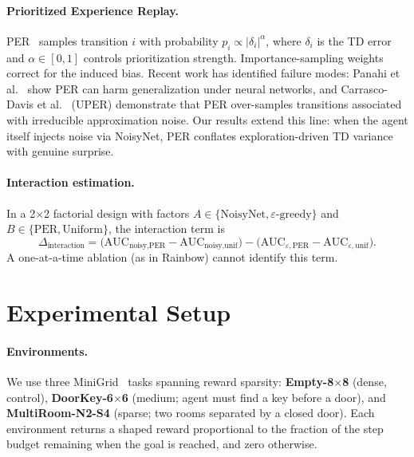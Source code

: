 \documentclass{article}
\begin{document}
\paragraph{Prioritized Experience Replay.}
PER~\cite{schaul2016prioritized} samples transition $i$ with probability
$p_i \propto |\delta_i|^\alpha$, where $\delta_i$ is the TD error and
$\alpha \in [0,1]$ controls prioritization strength.
Importance-sampling weights correct for the induced bias.
Recent work has identified failure modes: Panahi et al.~\cite{panahi2024per}
show PER can harm generalization under neural networks, and
Carrasco-Davis et al.~\cite{carrasco2025uper} (UPER) demonstrate that PER
over-samples transitions associated with irreducible approximation noise.
Our results extend this line: when the agent itself injects noise via
NoisyNet, PER conflates exploration-driven TD variance with genuine surprise.

\paragraph{Interaction estimation.}
In a 2$\times$2 factorial design with factors
$A \in \{\text{NoisyNet}, \varepsilon\text{-greedy}\}$ and
$B \in \{\text{PER}, \text{Uniform}\}$, the interaction term is
\begin{equation}
  \Delta_\text{interaction}
  = \bigl(\text{AUC}_{\text{noisy,PER}} - \text{AUC}_{\text{noisy,unif}}\bigr)
  - \bigl(\text{AUC}_{\varepsilon,\text{PER}} - \text{AUC}_{\varepsilon,\text{unif}}\bigr).
  \label{eq:interaction}
\end{equation}
A one-at-a-time ablation (as in Rainbow) cannot identify this term.

\section{Experimental Setup}
\label{sec:setup}

\paragraph{Environments.}
We use three MiniGrid~\cite{minigrid} tasks spanning reward sparsity:
\textbf{Empty-8$\times$8} (dense, control),
\textbf{DoorKey-6$\times$6} (medium; agent must find a key before a door),
and \textbf{MultiRoom-N2-S4} (sparse; two rooms separated by a closed door).
Each environment returns a shaped reward proportional to the fraction of the
step budget remaining when the goal is reached, and zero otherwise.
\end{document}
